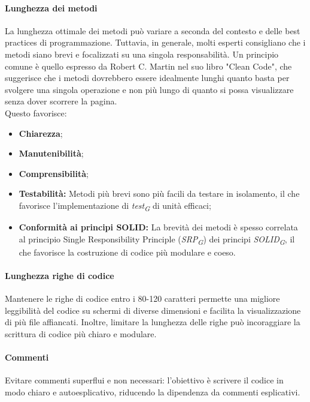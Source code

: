 \paragraph{Lunghezza dei metodi}
La lunghezza ottimale dei metodi può variare a seconda del contesto e delle best practices di programmazione. Tuttavia, in generale, molti esperti consigliano che i metodi siano brevi e focalizzati su una singola responsabilità.
Un principio comune è quello espresso da Robert C. Martin nel suo libro "Clean Code", che suggerisce che i metodi dovrebbero essere idealmente lunghi quanto basta per svolgere una singola operazione e non più lungo di quanto si possa visualizzare senza dover scorrere la pagina. \\
Questo favorisce:
\begin{itemize}
    \item \textbf{Chiarezza};
    \item \textbf{Manutenibilità};
    \item \textbf{Comprensibilità};
    \item \textbf{Testabilità:} Metodi più brevi sono più facili da testare in isolamento, il che favorisce l'implementazione di \textit{test}\textsubscript{\textit{G}} di unità efficaci;
    \item \textbf{Conformità ai principi SOLID:} La brevità dei metodi è spesso correlata al principio Single Responsibility Principle (\textit{SRP}\textsubscript{\textit{G}}) dei principi \textit{SOLID}\textsubscript{\textit{G}}, il che favorisce la costruzione di codice più modulare e coeso.
\end{itemize} 

\paragraph{Lunghezza righe di codice}
Mantenere le righe di codice entro i 80-120 caratteri permette una migliore leggibilità del codice su schermi di diverse dimensioni e facilita la visualizzazione di più file affiancati.
Inoltre, limitare la lunghezza delle righe può incoraggiare la scrittura di codice più chiaro e modulare.
\paragraph{Commenti}
Evitare commenti superflui e non necessari: l'obiettivo è scrivere il codice in modo chiaro e autoesplicativo, riducendo la dipendenza da commenti esplicativi. 

